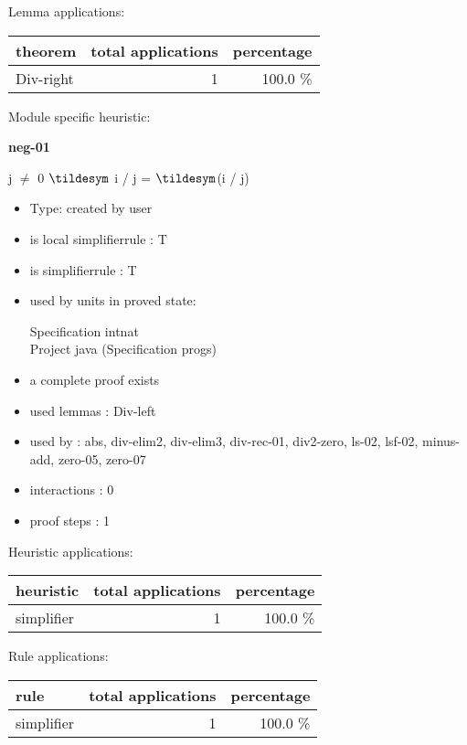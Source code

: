 \documentclass[a4paper]{article}
\begin{document}
Lemma applications:

\begin{supertabular}{l|r|r}
theorem	        & total applications & percentage \\ \hline
Div-right & 1 & 100.0 \% \\

\end{supertabular}

Module specific heuristic:

\pagebreak

{\LARGE\bf neg-01}\label{lemma-neg-01}

\medskip

j $\neq$ 0 \Fol $\tildesym$ i / j = $\tildesym$(i / j)

\begin{itemize}

\item Type: created by user

\item is local simplifierrule : T
\item is simplifierrule : T
\item used by units in proved state:

Specification intnat \\
Project java (Specification progs)
\item       a complete proof exists
\item       used lemmas  : Div-left
\item       used by      : abs, div-elim2, div-elim3, div-rec-01, div2-zero, ls-02, lsf-02, minus-add, zero-05, zero-07
\item       interactions : 0
\item       proof steps  : 1
\end{itemize}

\medskip


Heuristic applications:

\begin{supertabular}{l|r|r}
heuristic	& total applications & percentage \\ \hline
simplifier & 1 & 100.0 \% \\

\end{supertabular}

Rule applications:

\begin{supertabular}{l|r|r}
rule	        & total applications & percentage \\ \hline
simplifier & 1 & 100.0 \% \\

\end{supertabular}
\end{document}
